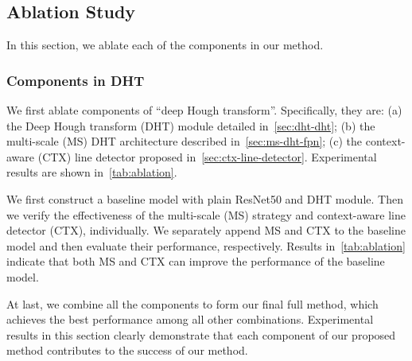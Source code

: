 \documentclass[10pt,journal,cspaper,compsoc]{IEEEtran}
\begin{document}
\subsection{Ablation Study} \label{sec:ablation}
In this section, we ablate each of the components in our method.

\subsubsection{Components in DHT} \label{sec:ablation-dht}
We first ablate components of ``deep Hough transform''.
%  
Specifically, they are:
(a) the Deep Hough transform (DHT) module detailed in~\cref{sec:dht-dht};
(b) the multi-scale (MS) DHT architecture described in~\cref{sec:ms-dht-fpn};
(c) the context-aware (CTX) line detector proposed in~\cref{sec:ctx-line-detector}.
%
Experimental results are shown in~\cref{tab:ablation}.

We first construct a baseline model with plain ResNet50 and DHT module.
%
% 
Then we verify the effectiveness of the multi-scale (MS) strategy and context-aware
line detector (CTX), individually.
%
We separately append MS and CTX to the baseline model and then evaluate their performance, respectively.
%
Results in~\cref{tab:ablation} indicate that both MS and CTX can improve
the performance of the baseline model.

At last, we combine all the components to form our final full method,
which achieves the best performance among all other combinations.
%
Experimental results in this section clearly demonstrate that each component of
our proposed method contributes to the success of our method.
\end{document}
